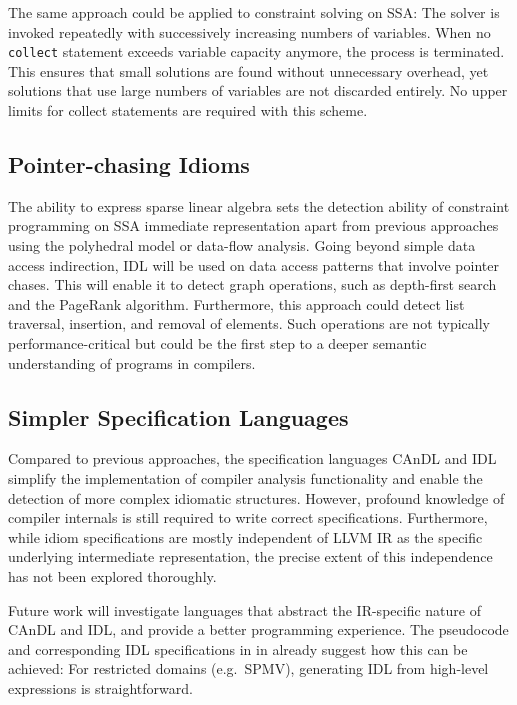     The same approach could be applied to constraint solving on SSA:
    The solver is invoked repeatedly with successively increasing numbers of
    variables.
    When no \texttt{collect} statement exceeds variable capacity anymore, the
    process is terminated.
    This ensures that small solutions are found without unnecessary
    overhead, yet solutions that use large numbers of variables are not
    discarded entirely.
    No upper limits for collect statements are required with this scheme.

\subsection*{Pointer-chasing Idioms}

    The ability to express sparse linear algebra sets the detection ability of
    constraint programming on SSA immediate representation apart from previous
    approaches using the polyhedral model or data-flow analysis.
    Going beyond simple data access indirection, IDL will be used on data access
    patterns that involve pointer chases.
    This will enable it to detect graph operations, such as depth-first search
    and the PageRank algorithm.
    Furthermore, this approach could detect list traversal, insertion, and
    removal of elements.
    Such operations are not typically performance-critical but could be the
    first step to a deeper semantic understanding of programs in compilers.

\subsection*{Simpler Specification Languages}

    Compared to previous approaches, the specification languages CAnDL and IDL
    simplify the implementation of compiler analysis functionality and enable
    the detection of more complex idiomatic structures.
    However, profound knowledge of compiler internals is still required to
    write correct specifications.
    Furthermore, while idiom specifications are mostly independent of
    LLVM IR as the specific underlying intermediate representation, the precise
    extent of this independence has not been explored thoroughly.

    Future work will investigate languages that abstract the IR-specific nature
    of CAnDL and IDL, and provide a better programming experience.
    The pseudocode and corresponding IDL specifications in
     in  already
    suggest how this can be achieved:
    For restricted domains (e.g.\ SPMV), generating IDL from high-level
    expressions is straightforward.

